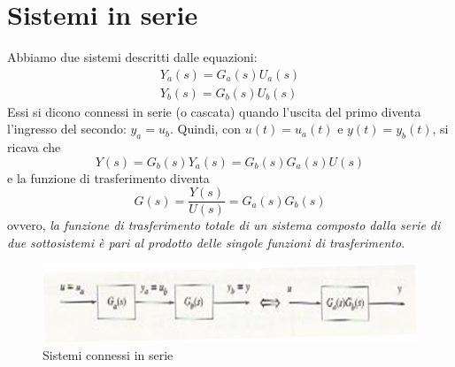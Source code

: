 \documentclass[a4paper]{report}
\begin{document}
\section{Sistemi in serie}
Abbiamo due sistemi descritti dalle equazioni:
\begin{eqnarray}
  Y_a(s) = G_a(s)U_a(s)\\
  Y_b(s) = G_b(s)U_b(s)
\end{eqnarray}
Essi si dicono connessi in serie (o cascata) quando l'uscita del primo
diventa l'ingresso del secondo: $y_a = u_b$. Quindi, con $u(t) = u_a(t)$
e $y(t) = y_b(t)$, si ricava che 
\begin{equation}
  Y(s) = G_b(s)Y_a(s) = G_b(s)G_a(s)U(s)
\end{equation}
e la funzione di trasferimento diventa
\begin{equation}
  G(s) = \dfrac{Y(s)}{U(s)} = G_a(s)G_b(s)
\end{equation}
ovvero, \emph{la funzione di trasferimento totale di un sistema
  composto dalla serie di due sottosistemi \`e pari al prodotto delle
  singole funzioni di trasferimento}.
\begin{figure}[!hbp]
  \begin{center}
    \includegraphics[scale=0.5]{./figures/serie.png}
    \caption{Sistemi connessi in serie}\label{fig:syserie}
  \end{center}
\end{figure}
\end{document}
